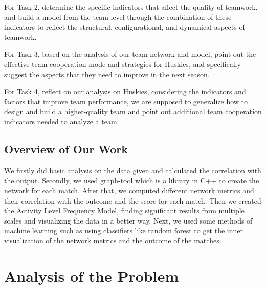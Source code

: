 \documentclass{mcmthesis}
\begin{document}
	For Task 2, determine the specific indicators that affect the quality of teamwork, and build a model from the team level through the combination of these indicators to reflect the structural, configurational, and dynamical aspects of teamwork.
	
	For Task 3, based on the analysis of our team network and model, point out the effective team cooperation mode and strategies for Huskies, and specifically suggest the aspects that they need to improve in the next season.
	
	For Task 4, reflect on our analysis on Huskies, considering the indicators and factors that improve team performance, we are supposed to generalize how to design and build a higher-quality team and point out additional team cooperation indicators needed to analyze a team.
	
	\subsection{Overview of Our Work}
		We firstly did basic analysis on the data given and calculated the correlation with the output. Secondly, we used graph-tool which is a library in C++ to create the network for each match. After that, we computed different network metrics and their correlation with the outcome and the score for each match. Then we created the Activity Level Frequency Model, finding significant results from multiple scales and visualizing the data in a better way. Next, we used some methods of machine learning such as using classifiers like random forest to get the inner visualization of the network metrics and the outcome of the matches. 
		

\section{Analysis of the Problem}
\end{document}
